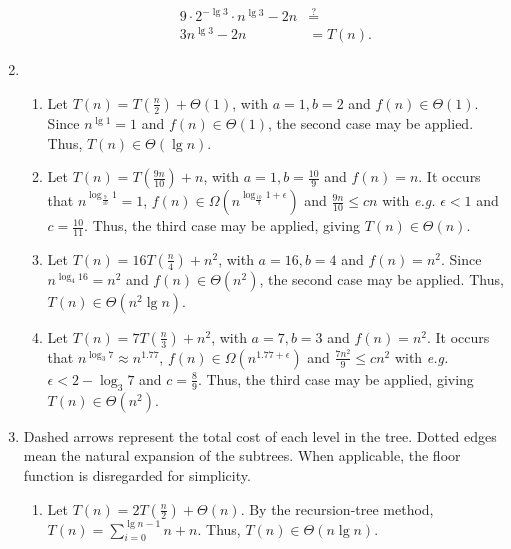 \documentclass[12pt]{article}
\begin{document}
\begin{enumerate}
\begin{enumerate}
\begin{align*}
            9 \cdot 2^{-\lg 3} \cdot n^{\lg 3} - 2n &\stackrel{?}{=} \\
            3n^{\lg 3} - 2n &= T(n).
        \end{align*}
    \end{enumerate}
    \item
    \begin{enumerate}
        \item Let $T(n) = T(\frac{n}{2}) + \Theta(1)$, with $a = 1, b = 2$ and $f(n) \in \Theta(1)$. Since $n^{\lg 1} = 1$ and $f(n) \in \Theta(1)$, the second case may be applied. Thus, $T(n) \in \Theta(\lg n)$.
        \item Let $T(n) = T(\frac{9n}{10}) + n$, with $a = 1, b = \frac{10}{9}$ and $f(n) = n$. It occurs that $n^{\log_{\frac{9}{10}} 1} = 1$, $f(n) \in \Omega(n^{\log_{\frac{10}{9}} 1 + \epsilon})$ and $\frac{9n}{10} \leq cn$ with \emph{e.g.} $\epsilon < 1$ and $c = \frac{10}{11}$. Thus, the third case may be applied, giving $T(n) \in \Theta(n)$.
        \item Let $T(n) = 16T(\frac{n}{4}) + n^{2}$, with $a = 16, b = 4$ and $f(n) = n^{2}$. Since $n^{\log_{4} 16} = n^{2}$ and $f(n) \in \Theta(n^{2})$, the second case may be applied. Thus, $T(n) \in \Theta(n^{2} \lg n)$.
        \item Let $T(n) = 7T(\frac{n}{3}) + n^{2}$, with $a = 7, b = 3$ and $f(n) = n^{2}$. It occurs that $n^{\log_{3} 7} \approx n^{1.77}$, $f(n) \in \Omega(n^{1.77 + \epsilon})$ and $\frac{7n^{2}}{9} \leq cn^{2}$ with \emph{e.g.} $\epsilon < 2 - \log_3 7$ and $c = \frac{8}{9}$. Thus, the third case may be applied, giving $T(n) \in \Theta(n^{2})$.
    \end{enumerate}
    \item Dashed arrows represent the total cost of each level in the tree. Dotted edges mean the natural expansion of the subtrees. When applicable, the floor function is disregarded for simplicity.
    \begin{enumerate}
        \item Let $T(n) = 2T(\frac{n}{2}) + \Theta(n)$. By the recursion-tree method, $T(n) = \sum_{i = 0}^{\lg n - 1} n + n$. Thus, $T(n) \in \Theta(n \lg n)$.
        \begin{figure}[htbp]
          \centering
\end{figure}
\end{enumerate}
\end{enumerate}
\end{document}

